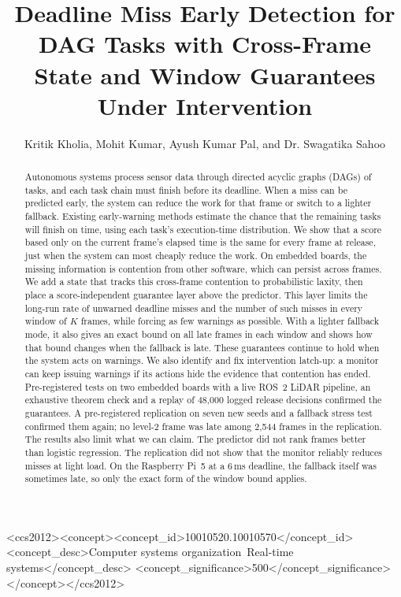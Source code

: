 \documentclass[acmsmall,screen]{acmart}
\begin{document}
\title{Deadline Miss Early Detection for DAG Tasks with Cross-Frame State and Window Guarantees Under Intervention}

\author{Kritik Kholia, Mohit Kumar, Ayush Kumar Pal, and Dr. Swagatika Sahoo}

\begin{abstract}
Autonomous systems process sensor data through directed acyclic graphs (DAGs) of tasks, and each task chain must finish before its deadline. When a miss can be predicted early, the system can reduce the work for that frame or switch to a lighter fallback. Existing early-warning methods estimate the chance that the remaining tasks will finish on time, using each task's execution-time distribution. We show that a score based only on the current frame's elapsed time is the same for every frame at release, just when the system can most cheaply reduce the work. On embedded boards, the missing information is contention from other software, which can persist across frames. We add a state that tracks this cross-frame contention to probabilistic laxity, then place a score-independent guarantee layer above the predictor. This layer limits the long-run rate of unwarned deadline misses and the number of such misses in every window of $K$ frames, while forcing as few warnings as possible. With a lighter fallback mode, it also gives an exact bound on all late frames in each window and shows how that bound changes when the fallback is late. These guarantees continue to hold when the system acts on warnings. We also identify and fix intervention latch-up: a monitor can keep issuing warnings if its actions hide the evidence that contention has ended. Pre-registered tests on two embedded boards with a live ROS~2 LiDAR pipeline, an exhaustive theorem check and a replay of 48,000 logged release decisions confirmed the guarantees. A pre-registered replication on seven new seeds and a fallback stress test confirmed them again; no level-2 frame was late among 2{,}544 frames in the replication. The results also limit what we can claim. The predictor did not rank frames better than logistic regression. The replication did not show that the monitor reliably reduces misses at light load. On the Raspberry Pi~5 at a 6\,ms deadline, the fallback itself was sometimes late, so only the exact form of the window bound applies.
\end{abstract}

\begin{CCSXML}
<ccs2012><concept><concept_id>10010520.10010570</concept_id><concept_desc>Computer systems organization~Real-time systems</concept_desc>
<concept_significance>500</concept_significance></concept></ccs2012>
\end{CCSXML}
\end{document}
